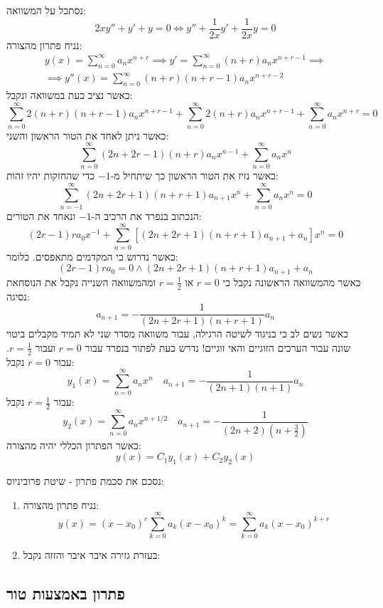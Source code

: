 \documentclass{tstextbook}
\begin{document}
\begin{example}
נסתכל על המשוואה:
$$2xy''+y'+y=0\iff y''+\frac{1}{2x}y'+\frac{1}{2x}y=0$$
נניח פתרון מהצורה:
$$\begin{gather}y(x)=\sum_{n=0}^{\infty} a_{n}x^{n+r}\implies y'=\sum_{n=0}^{\infty} (n+r)a_{n}x^{n+r-1}\implies \\\implies y''(x)=\sum_{n=0}^{\infty} (n+r)(n+r-1)a_{n}x^{n+r-2} 
\end{gather}$$
כאשר נציב כעת במשוואה ונקבל:
$$\sum_{n=0}^{\infty}2(n+r)(n+r-1)a_{n}x^{n+r-1}+\sum_{n=0}^{\infty}2(n+r)a_{n}x^{n+r-1}+ \sum_{n=0}^{\infty} a_{n}x^{n+r}=0$$
כאשר ניתן לאחד את הטור הראשון והשני:
$$\sum_{n=0}^{\infty} (2n+2r-1)(n+r)a_{n}x^{n-1}+\sum_{n=0}^{\infty} a_{n}x^{n}$$
כאשר נזיז את הטור הראשון כך שיתחיל מ-\(-1\) כדי שהחזקות יהיו זהות:
$$\sum_{n=-1}^{\infty} (2n+2r+1)(n+r+1)a_{n+1}x^{n}+\sum_{n=0}^{\infty} a_{n}x^{n}=0  $$
הנכתוב בנפרד את הרכיב ה-\(-1\) ונאחד את הטורים:
$$(2r-1)ra_{0}x^{-1}+\sum_{n=0}^{\infty}[(2n+2r+1)(n+r+1)a_{n+1}+a_{n}]x^{n}=0$$
כאשר נדרוש כי המקדמים מתאפסים. כלומר:
$$(2r-1)ra_{0}=0\land (2n+2r+1)(n+r+1)a_{n+1}+a_{n}$$
כאשר מהמשוואה הראשונה נקבל כי \(r=0\) או \(r=\frac{1}{2}\) ומהמשוואה השנייה נקבל את הנוסחאת נסיגה:
$$a_{n+1}=-\frac{1}{(2n+2r+1)(n+r+1)}a_{n}$$
כאשר נשים לב כי בניגוד לשיטה הרגילה, עבור משוואה מסדר שני לא תמיד מקבלים ביטוי שונה עבור הערכים הזוגיים והאי זוגיים! נדרש כעת לפתור בנפרד עבור \(r=0\) ועבור \(r=\frac{1}{2}\). עבור \(r=0\) נקבל:
$$y_{1}(x)=\sum_{n=0}^{\infty}a_{n}x^{n}\quad a_{n+1}= -\frac{1}{(2n+1)(n+1)}a_{n}$$
עבור \(r=\frac{1}{2}\) נקבל:
$$y_{2}(x)=\sum_{n=0}^{\infty} a_{n}x^{n+1/2}\quad a_{n+1}=- \frac{1}{(2n+2)\left( n+\frac{3}{2} \right)}$$
כאשר הפתרון הכללי יהיה מהצורה:
$$y(x)=C_{1}y_{1}(x)+C_{2}y_{2}(x)$$

\end{example}
נסכם את סכמת פתרון - שיטת פרוביניוס:

\begin{enumerate}
  \item נניח פתרון מהצורה: 
$$y(x)=(x-x_{0})^{r}\sum_{k=0}^{\infty}a_{k}(x-x_{0})^{k}=\sum_{k=0}^{\infty}a_{k}(x-x_{0})^{k+r}$$


  \item בעזרת גזירה איבר איבר והזזה נקבל: 


\end{enumerate}
\subsection{פתרון באמצעות טור}
\end{document}
